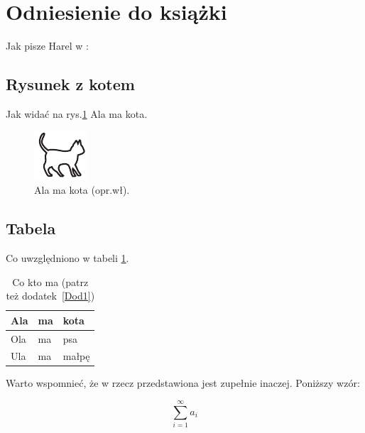\section{Odniesienie do książki}

Jak pisze Harel w \cite{harel_rzecz_2008}: \lipsum[7]


\subsection{Rysunek z kotem}

Jak widać na rys.\ref{rysunek:kot} Ala ma kota. \lipsum[9-10] 

\begin{figure}
\centering\includegraphics[width=.4\textwidth]{img/kotek}
\caption{Ala ma kota (opr.wł).}\label{rysunek:kot}
\end{figure}

\subsection{Tabela}

Co uwzględniono w tabeli \ref{tabela:coktoma}. \lipsum[13-15] 

\begin{table}
\centering\caption{Co kto ma \cite{harel_rzecz_2008} (patrz też dodatek~\ref{Dod1}) \label{tabela:coktoma}}
\begin{tabular}{|l|l|l|}%
\hline
Ala & ma & kota \\
\hline
Ola & ma & psa \\
\hline
Ula & ma & małpę\\
\hline
\end{tabular}
\end{table}

\lipsum[19-20] Warto wspomnieć, że w \cite{aizawa_groundwater_2009} rzecz przedstawiona jest zupełnie inaczej. Poniższy wzór:

\begin{equation}
\sum_{i=1}^{\infty}a_i
\label{eq:mojWzor}
\end{equation}

